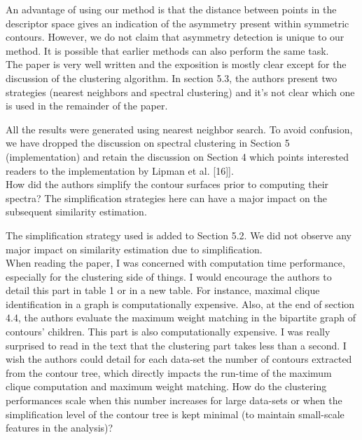 \documentclass[10pt]{article}
\begin{document}
   {\color{blue}An advantage of using our method is that the distance between
	   points in the descriptor space gives an indication of the asymmetry
	   present within symmetric contours. However, we do not claim that
	   asymmetry detection is unique to our method. It is possible that
   earlier methods can also perform the same task.}\\

The paper is very well written and the exposition is mostly clear except
   for the discussion of the clustering algorithm. In section 5.3, the
   authors present two strategies (nearest neighbors and spectral
   clustering) and it's not clear which one is used in the remainder of the
   paper.

   {\color{blue}All the results were generated using nearest neighbor search.
	   To avoid confusion, we have dropped the discussion on spectral
	   clustering in Section 5 (implementation) and retain the discussion
	   on Section 4 which points interested readers to the implementation
  by Lipman et al. [16]].}\\
   
   How did the authors simplify the contour surfaces prior to computing
   their spectra? The simplification strategies here can have a major impact
   on the subsequent similarity estimation.

   {\color{blue}The simplification strategy used is added to Section 5.2. We did not observe
   any major impact on similarity estimation due to simplification.}\\

   When reading the paper, I was concerned with computation time
   performance, especially for the clustering side of things. I would
   encourage the authors to detail this part in table 1 or in a new table.
   For instance, maximal clique identification in a graph is computationally
   expensive. Also, at the end of section 4.4, the authors evaluate the
   maximum weight matching in the bipartite graph of contours' children.
   This part is also computationally expensive. I was really surprised to
   read in the text that the clustering part takes less than a 
   second. I wish the authors could detail for each data-set the number of 
   contours extracted from the contour tree, which directly impacts the
   run-time of the maximum clique computation and maximum weight matching.
   How do the clustering performances scale when this number increases for
   large data-sets or when the simplification level of the contour tree is
   kept minimal (to maintain small-scale features in the analysis)?
\end{document}
